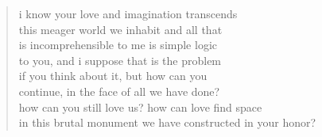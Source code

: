 \begin{verse}
i know your love and imagination transcends  \\
this meager world we inhabit and all that \\
is incomprehensible to me is simple logic \\
to you, and i suppose that is the problem \\
if you think about it, but how can you  \\
continue, in the face of all we have done? \\
how can you still love us? how can love find space \\
in this brutal monument we have constructed in your honor?
\end{verse}
